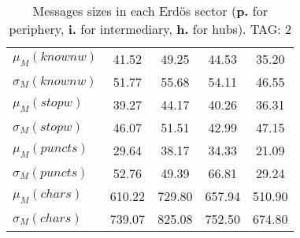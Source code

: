 \begin{table}[h!]
\begin{center}
\begin{tabular}{| l || c | c | c | c |}
$\mu_M(knownw)$ & 41.52  & 49.25  & 44.53  & 35.20 \\
$\sigma_M(knownw)$ & 51.77  & 55.68  & 54.11  & 46.55 \\\hline
$\mu_M(stopw)$ & 39.27  & 44.17  & 40.26  & 36.31 \\
$\sigma_M(stopw)$ & 46.07  & 51.51  & 42.99  & 47.15 \\\hline
$\mu_M(puncts)$ & 29.64  & 38.17  & 34.33  & 21.09 \\
$\sigma_M(puncts)$ & 52.76  & 49.39  & 66.81  & 29.24 \\\hline
$\mu_M(chars)$ & 610.22  & 729.80  & 657.94  & 510.90 \\
$\sigma_M(chars)$ & 739.07  & 825.08  & 752.50  & 674.80 \\\hline
\end{tabular}
\caption{Messages sizes in each Erd\"os sector ({{\bf p.}} for periphery, {{\bf i.}} for intermediary, {{\bf h.}} for hubs). TAG: 2}
\end{center}
\end{table}